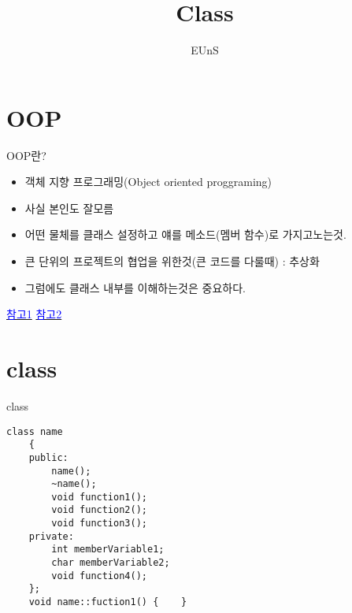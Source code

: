 \documentclass[10pt]{beamer}
\title{Class}
\author{EUnS}
\begin{document}
\begin{frame}
    \maketitle
\end{frame}    

\begin{frame}{}
    \tableofcontents
\end{frame}   

\section{OOP}
\begin{frame}{OOP란?}
    \begin{itemize}
        \item 객체 지향 프로그래밍(Object oriented proggraming)
        \item 사실 본인도 잘모름
        \item 어떤 물체를 클래스 설정하고 얘를 메소드(멤버 함수)로 가지고노는것.
        \item 큰 단위의 프로젝트의 협업을 위한것(큰 코드를 다룰때) : 추상화
        \item 그럼에도 클래스 내부를 이해하는것은 중요하다.
    \end{itemize}
    
    \href{https://megayuchi.com/2017/04/15/추상화의-허상/}{\textcolor{blue}{참고1}}
    \href{https://megayuchi.com/2017/07/10/멍청한-추상화-하지-마라/}{\textcolor{blue}{참고2}}

\end{frame}    


\section{class}

\begin{frame}[fragile]{class}
    \begin{lstlisting}[style = CStyle]
    class name
    {
    public:
        name();
        ~name();
        void function1();
        void function2();
        void function3();
    private:
        int memberVariable1;
        char memberVariable2;
        void function4();
    };
    void name::fuction1() {    }
    \end{lstlisting}
\end{frame}    
\end{document}
